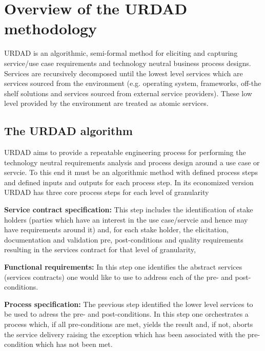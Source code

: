 \section{Overview of the URDAD methodology \label{sec:urdadMethodology}}

URDAD is an algorithmic, semi-formal method for eliciting and capturing service/use case requirements and technology neutral business process designs\cite{solms_urdad_2010}.
Services are recursively decomposed until the lowest level services which are services sourced from the environment (e.g. operating system, frameworks, off-the shelf solutions and services sourced from external service providers). These low level provided by the environment are treated as atomic services.

\subsection{The URDAD algorithm}

URDAD aims to provide a repeatable engineering process for performing the technology neutral requirements analysis and process design around a use case or servcie. To this end it must be an algorithmic method with defined process steps and defined inputs and outputs for each process step. In its economized version URDAD has three core process steps for each level of granularity
\begin{orderedlist}
 \item {\bf Service contract specification:} This step includes the identification of stake holders (parties which have an interest in the use case/servcie and hence may have requirements around it) and, for each stake holder, the elicitation, documentation and validation pre, post-conditions and quality requirements resulting in the services contract for that level of granularity, 
 \item {\bf Functional requirements:} In this step one identifies the abstract services (services contracts) one would like to use to address each of the pre- and post-conditions. 
 \item {\bf Process specification:} The previous step identified the lower level services to be used to adress the pre- and post-conditions. In this step one orchestrates a process which, if all pre-conditions are met, yields the result and, if not, aborts the service delivery raising the exception which has been associated with the pre-condition which has not been met.
\end{orderedlist}

